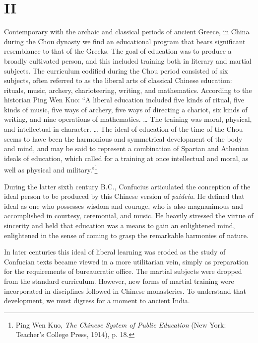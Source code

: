 \section*{II}

Contemporary with the archaic and classical periods of ancient Greece, in China during the Chou dynasty we find an educational program that bears significant resemblance to that of the Greeks. The goal of education was to produce a broadly cultivated person, and this included training both in literary and martial subjects. The curriculum codified during the Chou period consisted of six subjects, often referred to as the liberal arts of classical Chinese education: rituals, music, archery, charioteering, writing, and mathematics. According to the historian Ping Wen Kuo: ``A liberal education included five kinds of ritual, five kinds of music, five ways of archery, five ways of directing a chariot, six kinds of writing, and nine operations of mathematics. \ldots{} The training was moral, physical, and intellectual in character. \ldots{} The ideal of education of the time of the Chou seems to have been the harmonious and symmetrical development of the body and mind, and may be said to represent a combination of Spartan and Athenian ideals of education, which called for a training at once intellectual and moral, as well as physical and military.''\footnote{Ping Wen Kuo, \emph{The Chinese System of Public Education} (New York: Teacher's College Press, 1914), p. 18.}

During the latter sixth century B.C., Confucius articulated the conception of the ideal person to be produced by this Chinese version of \emph{paideia}. He defined that ideal as one who possesses wisdom and courage, who is also magnanimous and accomplished in courtesy, ceremonial, and music. He heavily stressed the virtue of sincerity and held that education was a means to gain an enlightened mind, enlightened in the sense of coming to grasp the remarkable harmonies of nature. 

In later centuries this ideal of liberal learning was eroded as the study of Confucian texts became viewed in a more utilitarian vein, simply as preparation for the requirements of bureaucratic office. The martial subjects were dropped from the standard curriculum. However, new forms of martial training were incorporated in disciplines followed in Chinese monasteries. To understand that development, we must digress for a moment to ancient India. 

